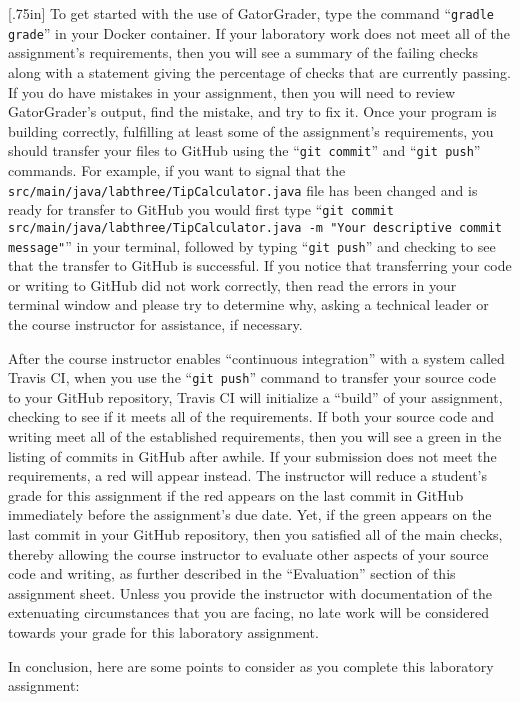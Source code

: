 \documentclass[11pt]{article}
\newcommand{\mainprogramsource}{\lstinline{src/main/java/labthree/TipCalculator.java}}
\newcommand{\gatorgraderstart}{\command{gradle grade}}
\newcommand{\gitcommit}{\command{git commit}}
\newcommand{\gitpush}{\command{git push}}
\newcommand{\gitcommitmainprogram}{\command{git commit src/main/java/labthree/TipCalculator.java -m "Your
descriptive commit message"}}
\newcommand{\command}[1]{``\lstinline{#1}''}
\newcommand{\step}[1]{``{#1}''}
\newcommand{\checkmark}{\ding{51}}
\newcommand{\naughtmark}{\ding{55}}
\newcommand{\caution}[1]{\null\hfill\LARGE{\faWarning{}}\newline\scriptsize{\em{#1}}}
\begin{document}
\marginnote{\caution{Write useful commits}}[.75in] To get started with the use
of GatorGrader, type the command \gatorgraderstart{} in your Docker container.
If your laboratory work does not meet all of the assignment's requirements, then
you will see a summary of the failing checks along with a statement giving the
percentage of checks that are currently passing. If you do have mistakes in your
assignment, then you will need to review GatorGrader's output, find the mistake,
and try to fix it. Once your program is building correctly, fulfilling at least
some of the assignment's requirements, you should transfer your files to GitHub
using the \gitcommit{} and \gitpush{} commands. For example, if you want to
signal that the \mainprogramsource{} file has been changed and is ready for
transfer to GitHub you would first type \gitcommitmainprogram{} in your
terminal, followed by typing \gitpush{} and checking to see that the transfer to
GitHub is successful. If you notice that transferring your code or writing to
GitHub did not work correctly, then read the errors in your terminal window and
please try to determine why, asking a technical leader or the course instructor
for assistance, if necessary.

After the course instructor enables \step{continuous integration} with a system
called Travis CI, when you use the \gitpush{} command to transfer your source
code to your GitHub repository, Travis CI will initialize a \step{build} of your
assignment, checking to see if it meets all of the requirements. If both your
source code and writing meet all of the established requirements, then you will
see a green \checkmark{} in the listing of commits in GitHub after awhile. If
your submission does not meet the requirements, a red \naughtmark{} will appear
instead. The instructor will reduce a student's grade for this assignment if the
red \naughtmark{} appears on the last commit in GitHub immediately before the
assignment's due date. Yet, if the green \checkmark{} appears on the last commit
in your GitHub repository, then you satisfied all of the main checks, thereby
allowing the course instructor to evaluate other aspects of your source code and
writing, as further described in the \step{Evaluation} section of this
assignment sheet. Unless you provide the instructor with documentation of the
extenuating circumstances that you are facing, no late work will be considered
towards your grade for this laboratory assignment.

In conclusion, here are some points to consider as you complete this laboratory
assignment:
\end{document}
